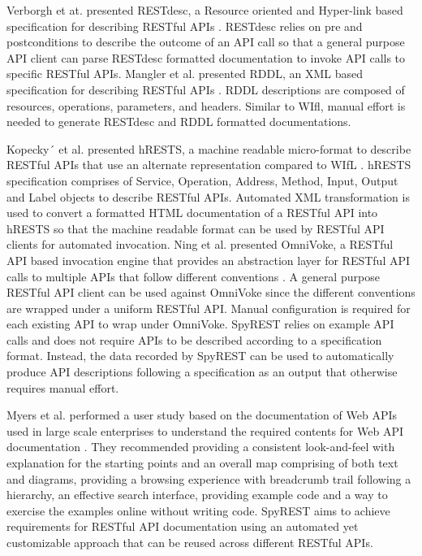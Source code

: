 \documentclass[conference]{IEEEtran}
\begin{document}
Verborgh et at. presented RESTdesc, a Resource oriented and Hyper-link based specification for describing RESTful APIs \cite{Verborgh_functional}. RESTdesc relies on pre and postconditions to describe the outcome of an API call so that a general purpose API client can parse RESTdesc formatted documentation to invoke API calls to specific RESTful APIs. Mangler et al. presented RDDL, an XML based specification for describing RESTful APIs \cite{Mangler_rddl}. RDDL descriptions are composed of resources, operations, parameters, and headers. Similar to WIfl, manual effort is needed to generate RESTdesc and RDDL formatted documentations.

Kopecky´ et al. presented hRESTS, a machine readable micro-format to describe RESTful APIs that use an alternate representation compared to WIfL \cite{Kopecky_hrests}. hRESTS specification comprises of Service, Operation, Address, Method, Input, Output and Label objects to describe RESTful APIs. Automated XML transformation is used to convert a formatted HTML documentation of a RESTful API into hRESTS so that the machine readable format can be used by RESTful API clients for automated invocation. Ning et al. presented OmniVoke, a RESTful API based invocation engine that provides an abstraction layer for RESTful API calls to multiple APIs that follow different conventions \cite{Ning_omnivoke}. A general purpose RESTful API client can be used against OmniVoke since the different conventions are wrapped under a uniform RESTful API. Manual configuration is required for each existing API to wrap under OmniVoke. SpyREST relies on example API calls and does not require APIs to be described according to a specification format. Instead, the data recorded by SpyREST can be used to automatically produce API descriptions following a specification as an output that otherwise requires manual effort.

Myers et al. performed a user study based on the documentation of Web APIs used in large scale enterprises to understand the required contents for Web API documentation \cite{Myers_study}. They recommended providing a consistent look-and-feel with explanation for the starting points and an overall map comprising of both text and diagrams, providing a browsing experience with breadcrumb trail following a hierarchy, an effective search interface, providing example code and a way to exercise the examples online without writing code. SpyREST aims to achieve requirements for RESTful API documentation using an automated yet customizable approach that can be reused across different RESTful APIs.
\end{document}
